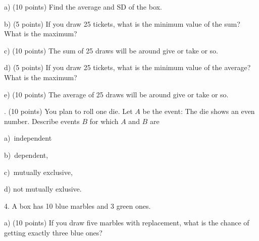 \documentclass[10pt]{article}
\begin{document}
\hspace{10pt} a) (10 points) Find the average and SD of the box.
\vspace{2in}

\hspace{10pt} b) (5 points)
If you draw 25 tickets, what is the minimum value of the sum?  What is the maximum?
\vspace{1.3in}

\hspace{10pt} c) (10 points) The sum of 25 draws will be around \underline{\hspace{1in}} give or take
\underline{\hspace{1in}} or so.
\vspace{1.3in}

\hspace{10pt} d) (5 points)
If you draw 25 tickets, what is the minimum value of the average?  What is the maximum?
\vspace{1.3in}

\hspace{10pt} e) (10 points) The average of 25 draws will be around \underline{\hspace{1in}} give or take
\underline{\hspace{1in}} or so.
\vspace{1.3in}


\vfill
{}. (10 points) You plan to roll one die.
Let $A$ be the event: The die shows an even number.
Describe events $B$ for which
$A$ and $B$ are

\hspace{10pt} a)~independent
\vspace{.3in}

\hspace{10pt} b)~dependent,
\vspace{.3in}

\hspace{10pt} c)~mutually exclusive, 
\vspace{.3in}

\hspace{10pt} d) not mutually exlusive.
\vspace{.3in}

4.  A box has 10 blue marbles and 3 green ones.  

\hspace{20pt} a) (10 points) If you draw five marbles with replacement, what is the chance of getting 
exactly three blue ones?
\vspace{1.9in}
\end{document}
